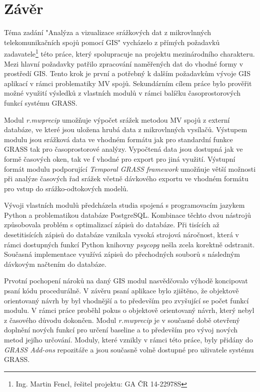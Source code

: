 \documentclass[a4paper,12pt,oneside]{report}
\newcommand{\necislovana}[1]{%
\phantomsection
\addcontentsline{toc}{section}{#1}
\section*{#1}
\markboth{\uppercase{#1}}{}
}
\begin{document}
\newpage
\necislovana{Závěr}

Téma zadání "Analýza a vizualizace srážkových dat z mikrovlnných
telekomunikačních spojů pomocí GIS" vycházelo z přímých požadavků
zadavatele\footnote{Ing. Martin Fencl, řešitel projektu: GA ČR 14-22978S } této práce, který spolupracuje na projektu mezinárodního
charakteru. Mezi hlavní požadavky patřilo zpracování naměřených dat do
vhodné formy v prostředí GIS. Tento krok je první a potřebný k dalším
požadavkům vývoje GIS aplikací v rámci problematiky MV
spojů. Sekundárním cílem práce bylo prověřit možné využití
výsledků z vlastních modulů v rámci balíčku časoprostorových funkcí
systému GRASS.

Modul \textit{r.mwprecip} umožňuje výpočet srážek metodou MV spojů z
externí databáze, ve které jsou uložena hrubá data z mikrovlnných
vysílačů. Výstupem modulu jsou srážková data ve vhodném formátu  jak pro standardní
funkce GRASS tak pro časoprostorové analýzy. Vypočtená data jsou
dostupná jak ve formě časových oken, tak ve f vhodné pro export
pro jiná využití. Výstupní formát modulu podporující \textit{Temporal GRASS
  framework} umožňuje větší možnosti při analýze časových řad srážek
včetně dávkového exportu ve vhodném formátu pro vstup do
srážko-odtokových modelů.


Vývoji vlastních modulů předcházela studia spojená s programovacím
jazykem Python a problematikou databáze PostgreSQL. Kombinace těchto
dvou nástrojů způsobovala problém s optimalizací zápisů do databáze.
Při tisících až desetitisících zápisů do databáze vznikala vysoká
strojová náročnost, která v rámci dostupných funkcí Python knihovny
\textit{psycopg} nešla zcela korektně odstranit. Současná implementace
využívá zápisů do přechodných souborů s následným dávkovým načtením do
databáze.

Prvotní pochopení nároků na daný GIS modul nasvědčovalo výhodě koncipovat 
psaní kódu procedurálně. V závěru psaní aplikace bylo zjištěno, že objektově 
orientovaný návrh by byl vhodnější a to především pro zvyšující se počet funkcí
 modulu. V rámci práce proběhl pokus o objektově orientovaný návrh, 
 který nebyl z časového důvodu dokončen.
Modul \textit{r.mwprecip} je v současné době otevřený doplnění nových
funkcí pro určení baseline a to především pro vývoj nových
metod jejího určování. Moduly, které vznikly v rámci této práce, byly přidány do 
 \textit{GRASS Add-ons} repozitáře 
a jsou současně volně dostupné pro uživatele systému GRASS. 
\end{document}
